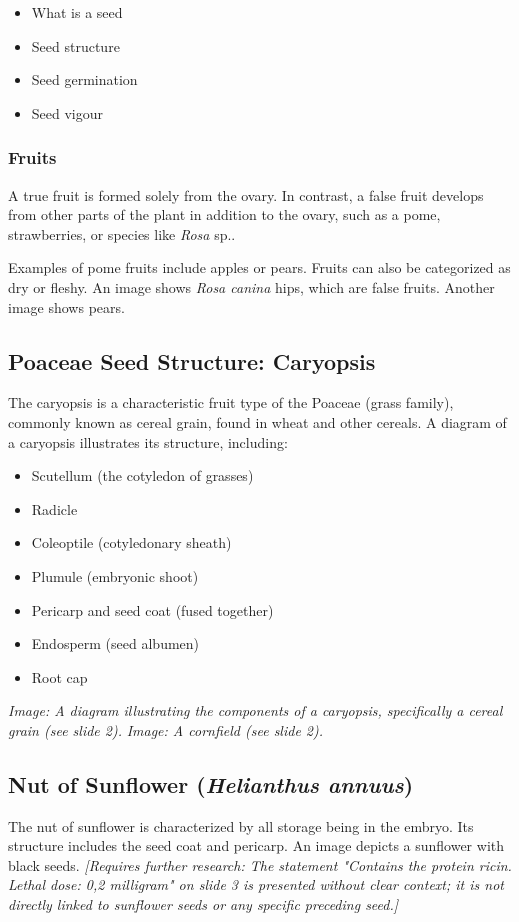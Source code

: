 \begin{itemize} 
    \item What is a seed 
    \item Seed structure 
    \item Seed germination 
    \item Seed vigour 
\end{itemize}

\subsubsection*{Fruits} 
A true fruit is formed solely from the ovary. In contrast, a false fruit develops from other parts of the plant in addition to the ovary, such as a pome, strawberries, or species like \textit{Rosa} sp.. 

Examples of pome fruits include apples or pears. Fruits can also be categorized as dry or fleshy. An image shows \textit{Rosa canina} hips, which are false fruits. Another image shows pears.

\subsection{Poaceae Seed Structure: Caryopsis} 
The caryopsis is a characteristic fruit type of the Poaceae (grass family), commonly known as cereal grain, found in wheat and other cereals. A diagram of a caryopsis illustrates its structure, including: 

\begin{itemize} 
    \item Scutellum (the cotyledon of grasses) 
    \item Radicle 
    \item Coleoptile (cotyledonary sheath) 
    \item Plumule (embryonic shoot) 
    \item Pericarp and seed coat (fused together) 
    \item Endosperm (seed albumen) 
    \item Root cap 
\end{itemize} 

\textit{Image: A diagram illustrating the components of a caryopsis, specifically a cereal grain (see slide 2).} \textit{Image: A cornfield (see slide 2).}

\subsection{Nut of Sunflower (\textit{Helianthus annuus})} 
The nut of sunflower is characterized by all storage being in the embryo. Its structure includes the seed coat and pericarp. An image depicts a sunflower with black seeds. \textit{[Requires further research: The statement "Contains the protein ricin. Lethal dose: 0,2 milligram" on slide 3 is presented without clear context; it is not directly linked to sunflower seeds or any specific preceding seed.]}

